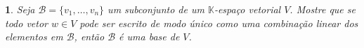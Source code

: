 \documentclass[12pt]{exam}
\newtheorem{exercicio}{}
\newcommand{\cp}[1]{\mathbb{#1}}
\begin{document}
\begin{exercicio}
  Seja $\mathcal{B} = \{v_1, \ldots, v_n\}$ um subconjunto de um $\cp{K}$-espa\c{c}o vetorial $V$. Mostre que se todo vetor $w \in V$ pode ser escrito de modo \'unico como uma combina\c{c}\~ao linear dos elementos em $\mathcal{B}$, ent\~ao $\mathcal{B}$ \'e uma base de $V$.
\end{exercicio}











% 
\end{document}
